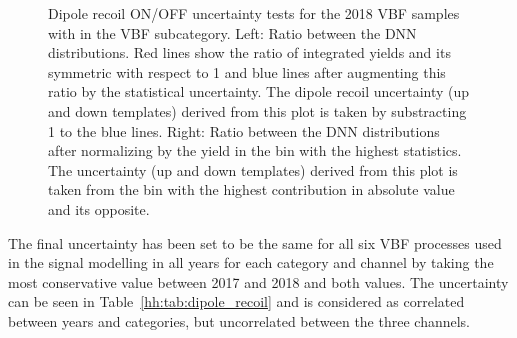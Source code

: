 \documentclass[../main.tex]{subfiles}
\begin{document}
\begin{figure}[h!]
\begin{center}
\end{center}
\caption{Dipole recoil ON/OFF uncertainty tests for the 2018 VBF samples with  in the VBF subcategory. Left: Ratio between the DNN distributions. Red lines show the ratio of integrated yields and its symmetric with respect to 1 and blue lines after augmenting this ratio by the statistical uncertainty. The dipole recoil uncertainty (up and down templates) derived from this plot is taken by substracting 1 to the blue lines. Right: Ratio between the DNN distributions after normalizing by the yield in the bin with the highest statistics. The uncertainty (up and down templates) derived from this plot is taken from the bin with the highest contribution in absolute value and its opposite.}
\label{hh:fig:dipole_recoil}

\end{figure}


The final uncertainty has been set to be the same for all six VBF processes used in the signal modelling in all years for each category and channel by taking the most conservative value between 2017 and 2018 and both \kvv values. The uncertainty can be seen in Table~\ref{hh:tab:dipole_recoil} and is considered as correlated between years and categories, but uncorrelated between the three channels.
\end{document}
